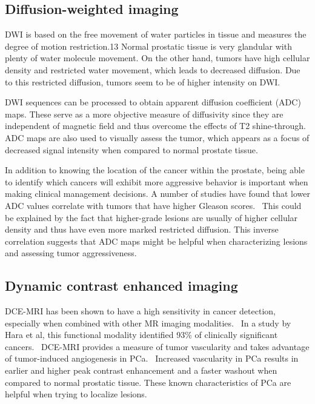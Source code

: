 \subsection{Diffusion-weighted imaging}
DWI is based on the free movement of water particles in tissue and measures the
degree of motion restriction.13 Normal prostatic tissue is very glandular with
plenty of water molecule movement. On the other hand, tumors have high cellular
density and restricted water movement, which leads to decreased diffusion. Due
to this restricted diffusion, tumors seem to be of higher intensity on
DWI.~\cite{Koh2007}

DWI sequences can be processed to obtain apparent diffusion coefficient (ADC)
maps. These serve as a more objective measure of diffusivity since they are
independent of magnetic field and thus overcome the effects of T2
shine-through.~\cite{Turkbey2012,Koh2007}  ADC maps are also used to visually
assess the tumor, which appears as a focus of decreased signal intensity when
compared to normal prostate tissue.~\cite{Tan2011}

In addition to knowing the location of the cancer within the prostate, being
able to identify which cancers will exhibit more aggressive behavior is
important when making clinical management decisions. A number of studies have
found that lower ADC values correlate with tumors that have higher Gleason
scores.~\cite{Kobus2012,Woodfield2010,Hambrock2011} This could be explained by
the fact that higher-grade lesions are usually of higher cellular density and
thus have even more marked restricted diffusion. This inverse correlation
suggests that ADC maps might be helpful when characterizing lesions and
assessing tumor aggressiveness.~\cite{Vargas2011}

\subsection{Dynamic contrast enhanced imaging}
DCE-MRI has been shown to have a high sensitivity in cancer detection,
especially when combined with other MR imaging
modalities.~\cite{Tanimoto2007,Girouin2007,Ocak2007,Kim2005} In a study by Hara
et al, this functional modality identified 93\% of clinically significant
cancers.~\cite{Hara2005} DCE-MRI provides a measure of tumor vascularity and
takes advantage of tumor-induced angiogenesis in PCa.~\cite{Noworolski2005}
Increased vascularity in PCa results in earlier and higher peak contrast
enhancement and a faster washout when compared to normal prostatic tissue.
These known characteristics of PCa are helpful when trying to localize lesions. 

